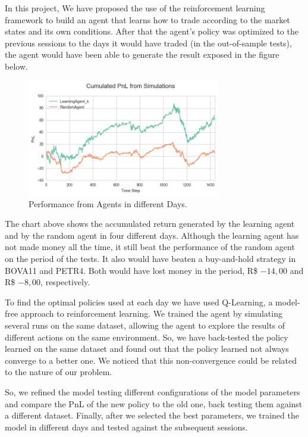 \documentclass[a4paper]{article}
\begin{document}
In this project, We have proposed the use of the reinforcement learning framework to build an agent that learns how to trade according to the market states and its own conditions. After that the agent's policy was optimized to the previous sessions to the days it would have traded (in the out-of-sample tests), the agent would have been able to generate the result exposed in the figure below.

\begin{figure}[ht]
\centering
\includegraphics[width=0.75\textwidth]{figures/optm_rand_several_days.png}
\caption{\label{fig:optm_rand_several_days}Performance from Agents in different Days.}
\end{figure}

The chart above shows the accumulated return generated by the learning agent and by the random agent in four different days. Although the learning agent has not made money all the time, it still beat the performance of the random agent on the period of the tests. It also would have beaten a buy-and-hold strategy in BOVA11 and PETR4. Both would have lost money in the period, R\$ $-14,00$ and R\$ $-8,00$, respectively.

To find the optimal policies used at each day we have used Q-Learning, a model-free approach to reinforcement learning. We trained the agent by simulating several runs on the same dataset, allowing the agent to explore the results of different actions on the same environment. So, we have back-tested the policy learned on the same dataset and found out that the policy learned not always converge to a better one. We noticed that this non-convergence could be related to the nature of our problem.

So, we refined the model testing different configurations of the model parameters and compare the PnL of the new policy to the old one, back testing them against a different dataset. Finally, after we selected the best parameters, we trained the model in different days and tested against the subsequent sessions.
\end{document}
